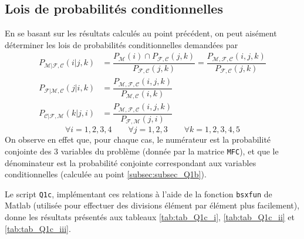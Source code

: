 \documentclass[a4paper, 12pt]{article}
\newcommand{\M}{\mathcal{M}}
\newcommand{\F}{\mathcal{F}}
\newcommand{\C}{\mathcal{C}}
\begin{document}
	\subsection{Lois de probabilités conditionnelles}
	\label{subsec:subsec_Q1c}
	En se basant sur les résultats calculés au point précédent, on peut aisément déterminer les lois de probabilités conditionnelles demandées par
	\begin{align*}
	    P_{\M|\F,\C}\left(i|j,k\right) &= \dfrac{P_{\M}\left(i\right)\cap P_{\F, \C}\left(j,k\right)}{P_{\F,\C}\left(j,k\right)} = \dfrac{P_{\M,\F,\C}\left(i,j,k\right)}{P_{\F,\C}\left(j,k\right)}\\
	    P_{\F|\M,\C}\left(j|i,k\right) &= \dfrac{P_{\M,\F,\C}\left(i,j,k\right)}{P_{\M,\C}\left(i,k\right)}\\
	    P_{\C|\F,\M}\left(k|j,i\right) &= \dfrac{P_{\M,\F,\C}\left(i,j,k\right)}{P_{\F,\M}\left(j,i\right)}
	\end{align*}
	\begin{displaymath}
	    \forall i=1,2,3,4 \qquad\forall j = 1,2,3\qquad\forall k = 1,2,3,4,5
	\end{displaymath}
	On observe en effet que, pour chaque cas, le numérateur est la probabilité conjointe des 3 variables du problème (donnée par la matrice \texttt{MFC}), et que le dénominateur est la probabilité conjointe correspondant aux variables conditionnelles (calculée au point \ref{subsec:subsec_Q1b}).\par
	Le script \texttt{Q1c}, implémentant ces relations à l'aide de la fonction \texttt{bsxfun} de Matlab (utilisée pour effectuer des divisions élément par élément plus facilement), donne les résultats présentés aux tableaux \ref{tab:tab_Q1c_i}, \ref{tab:tab_Q1c_ii} et \ref{tab:tab_Q1c_iii}.\par
\end{document}
